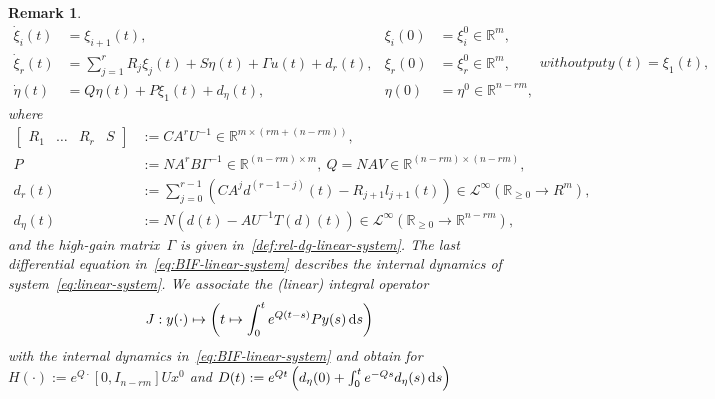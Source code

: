 \documentclass[ envcountsect, envcountsame]{svjour3}
\newtheorem{Remark}[Theorem]{Remark}
\newcommand{\ds}{\text{\normalfont d}s}
\newcommand{\R}{\mathbb{R}}
\newcommand{\cL}{\mathcal{L}}
\newcommand{\rp}{\mathbb{R}_{\geq 0}}
\begin{document}
\begin{Remark}
\begin{subequations}
\begin{equation} \label{eq:BIF-linear-system}
\begin{aligned}
\dot \xi_i(t) &= \xi_{i+1}(t),  &\xi_{i}(0) &= \xi_{i}^0 \in \R^m, \\
\dot \xi_r(t) &= \sum_{j=1}^{r} R_j \xi_j(t) + S \eta(t) + \Gamma u(t) + d_r(t) , &\xi_r(0) &= \xi_r^0 \in \R^m, \\
\dot \eta(t) &= Q \eta(t) + P \xi_1(t) + d_\eta(t)  , & \eta(0) &= \eta^0 \in \R^{n-rm},
\end{aligned}
\end{equation}
with output
\begin{equation} \label{eq:BIF-linear-output}
y(t) = \xi_1(t),
\end{equation}
\end{subequations}
%
where
\begin{equation*}
\begin{aligned}
\begin{bmatrix}
R_1 & \ldots & R_r & S
\end{bmatrix} & := CA^r U^{-1} \in \R^{m \times (rm + (n-rm))}, \\
P & := NA^r B \Gamma^{-1} \in \R^{(n-rm) \times m}, \ Q = NAV \in \R^{(n-rm) \times (n-rm)}, \\
d_r(t) & := \sum_{j=0}^{r-1} \left( CA^{j} d^{(r-1-j)}(t) - R_{j+1} l_{j+1}(t) \right) \in \cL^\infty(\rp \to R^m) , \\
d_\eta(t) & := N \left( d(t) - AU^{-1} T(d)(t) \right) \in \cL^\infty(\rp \to \R^{n-rm}) ,
\end{aligned}
\end{equation*}
and the high-gain matrix~$\Gamma$ is given in~\eqref{def:rel-dg-linear-system}.
The last differential equation in~\eqref{eq:BIF-linear-system} describes the internal dynamics of system~\eqref{eq:linear-system}.
We associate the (linear) integral operator
\begin{equation} \label{def:integral-operator}
J: y(\cdot) \mapsto \left(t \mapsto \int_{0}^{t} e^{Q(t-s)} P y(s) \, \ds  \right)
\end{equation}
with the internal dynamics in~\eqref{eq:BIF-linear-system} and obtain for 
${H(\cdot) := e^{Q \cdot} [0, I_{n-rm}] U x^0}$ 
and $D(t) := e^{Qt} \left(d_\eta(0) + \int_0^{t} e^{-Qs} d_\eta(s) \, \ds \right)$

\end{Remark}
\end{document}
